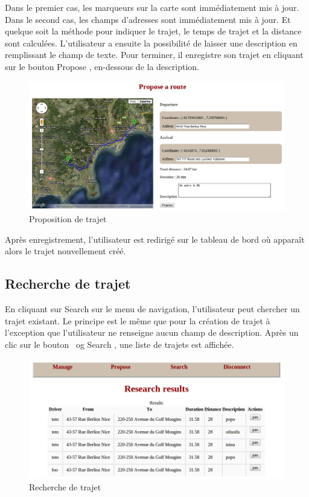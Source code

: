 \documentclass[a4paper]{article}
\begin{document}
Dans le premier cas, les marqueurs sur la carte sont immédiatement mis à jour.
Dans le second cas, les champs d'adresses sont immédiatement mis à jour.
Et quelque soit la méthode pour indiquer le trajet, le temps de trajet
et la distance sont calculées. L'utilisateur a ensuite la possibilité de
laisser une description en remplissant le champ de texte.
Pour terminer, il enregistre son trajet en cliquant sur le bouton
\og Propose \fg, en-dessous de la description.

\begin{figure}[!ht]
	\centering
	\includegraphics[scale=0.4]{Propose.png}
	\caption{\label{propose} Proposition de trajet}
\end{figure}

Après enregistrement, l'utilisateur est redirigé sur le tableau de
bord où apparaît alors le trajet nouvellement créé.

\subsection{Recherche de trajet}

En cliquant sur \og Search \fg sur le menu de navigation, l'utilisateur
peut chercher un trajet existant. Le principe est le même que pour la création
de trajet à l'exception que l'utilisateur ne renseigne aucun champ de description.
Après un clic sur le bouton \ og Search \fg, une liste de trajets est affichée. 

\begin{figure}[!ht]
	\centering
	\includegraphics[scale=0.5]{Search.png}
	\caption{\label{search} Recherche de trajet}
\end{figure}
\newpage
\end{document}
